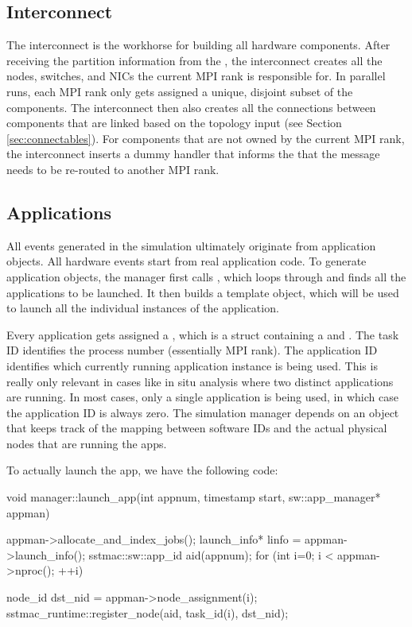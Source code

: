 \begin{enumerate}
\subsection{Interconnect}\label{subsec:interconnect}
The interconnect is the workhorse for building all hardware components.
After receiving the partition information from the ,
the interconnect creates all the nodes, switches, and NICs the current MPI rank is responsible for.
In parallel runs, each MPI rank only gets assigned a unique, disjoint subset of the components.
The interconnect then also creates all the connections between components that are linked based on the topology input (see Section \ref{sec:connectables}).
For components that are not owned by the current MPI rank, the interconnect inserts a dummy handler that informs the 
that the message needs to be re-routed to another MPI rank.

\subsection{Applications}\label{subsec:apps}
All events generated in the simulation ultimately originate from application objects.
All hardware events start from real application code.
To generate application objects,
the manager first calls , which loops through and finds all the applications to be launched.
It then builds a template object, which will be used to launch all the individual instances of the application.

Every application gets assigned a , which is a struct containing a  and .
The task ID identifies the process number (essentially MPI rank). 
The application ID identifies which currently running application instance is being used.
This is really only relevant in cases like in situ analysis where two distinct applications are running.
In most cases, only a single application is being used, in which case the application ID is always zero.
The simulation manager depends on an  object that keeps track of the mapping between software IDs and the actual physical nodes that are running the apps.

To actually launch the app, we have the following code:

\begin{CppCode}
void
manager::launch_app(int appnum, timestamp start, sw::app_manager* appman)
{
  appman->allocate_and_index_jobs();
  launch_info* linfo = appman->launch_info();
  sstmac::sw::app_id aid(appnum);
  for (int i=0; i < appman->nproc(); ++i) {
    node_id dst_nid = appman->node_assignment(i);
    sstmac_runtime::register_node(aid, task_id(i), dst_nid);

}}
\end{CppCode}
\end{enumerate}
